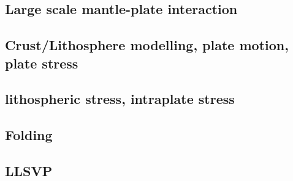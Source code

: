 \subsection*{Large scale mantle-plate interaction}

\cite{algs12}

\subsection*{Crust/Lithosphere modelling, plate motion, plate stress}

\cite{daco88}
\cite{nefo93}
\cite{thsj97}
\cite{bird98}
\cite{lecd98}
\cite{will99b}
\cite{hanl00}\cite{labp00}
\cite{homo01}\cite{beoc01}
\cite{labu02}\cite{coli02}
\cite{wipo03}\cite{wabu03}
\cite{tibb04}
\cite{hagu05}\cite{wiwg05}
\cite{libi06}
\cite{afrf07}
\cite{affr08}\cite{tibb08}
\cite{hapo08}
\cite{hamo10}
\cite{rera11}
\cite{wagw12}\cite{vacl12}
\cite{wazh13}
\cite{kava14}\cite{dusp14}\cite{rugb14}\cite{wavp14}\cite{whbb14}\cite{scml14}
\cite{wavp15}\cite{thkp15}
\cite{rugb17}
\cite{koen19}

\subsection*{lithospheric stress, intraplate stress}

\cite{fouy75}
\cite{riso76}
\cite{riso79}
\cite{worg91}
\cite{rich92}\cite{wuvr92}\cite{zoba92}
\cite{stsm01}
\cite{ligu04}
\cite{timr05}
\cite{bilr08}\cite{ghhw08}
\cite{ghhf09}
\cite{nacl09}
\cite{nalr12}\cite{ghho12}
\cite{ghhw13}


\subsection*{Folding}

\cite{ramb68}
\cite{ramb70}
\cite{ramb71}
\cite{reds12}
\cite{regc13}

\subsection*{LLSVP}

\cite{limc13}


